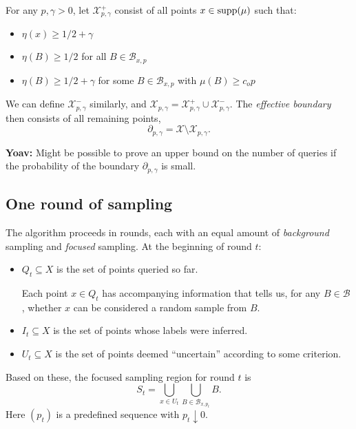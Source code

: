 \documentclass{article}
\def\X{{\mathcal X}}
\def\B{{\mathcal B}}
\def\supp{{\rm supp}}
\begin{document}
\begin{enumerate}
For any $p, \gamma > 0$, let $\X_{p, \gamma}^+$ consist of all points $x \in \supp(\mu)$ such that:
\begin{itemize}
\item $\eta(x) \geq 1/2 + \gamma$
\item $\eta(B) \geq 1/2$ for all $B \in \B_{x,p}$
\item $\eta(B) \geq 1/2 + \gamma$ for some $B \in \B_{x,p}$ with $\mu(B) \geq c_o p$
\end{itemize}
We can define $\X_{p,\gamma}^-$ similarly, and $\X_{p,\gamma} = \X_{p,\gamma}^+ \cup \X_{p,\gamma}^-$. The {\it effective boundary} then consists of all remaining points,
$$ \partial_{p,\gamma} = \X \setminus \X_{p,\gamma} .$$

\end{enumerate}

{\bf Yoav:} Might be possible to prove an upper bound on the number of queries if the probability of the boundary $\partial_{p,\gamma}$ is small.

\subsection{One round of sampling}

The algorithm proceeds in rounds, each with an equal amount of {\it background} sampling and {\it focused} sampling. At the beginning of round $t$:
\begin{itemize}
\item $Q_t \subseteq X$ is the set of points queried so far. 

Each point $x \in Q_t$ has accompanying information that tells us, for any $B \in \B$, whether $x$ can be considered a random sample from $B$.

\item $I_t \subseteq X$ is the set of points whose labels were inferred.

\item $U_t \subseteq X$ is the set of points deemed ``uncertain'' according to some criterion.
\end{itemize}
Based on these, the focused sampling region for round $t$ is
$$ S_t = \bigcup_{x \in U_t} \bigcup_{B \in \B_{x, p_t}} B .$$
Here $(p_t)$ is a predefined sequence with $p_t \downarrow 0$.
\end{document}
